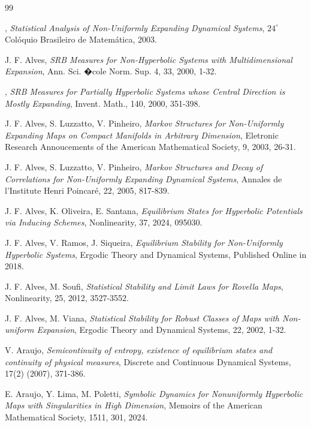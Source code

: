 \documentclass[12pt,a4paper]{amsart}
\theoremstyle{plain}
\begin{document}
 
\begin{thebibliography}{99}
	
	, {\it Statistical Analysis of Non-Uniformly Expanding Dynamical Systems}, $24^{\circ}$ Col\' oquio Brasileiro de Matem\' atica, 2003.
	
	 {\sc J. F. Alves}, {\it SRB Measures for Non-Hyperbolic Systems with Multidimensional Expansion}, Ann. Sci. �cole Norm. Sup. 4, 33, 2000, 1-32.
	
	, {\it SRB Measures for Partially Hyperbolic Systems whose Central Direction is Mostly Expanding}, Invent. Math., 140, 2000, 351-398.
	
	 {\sc J. F. Alves, S. Luzzatto, V. Pinheiro}, {\it Markov Structures for Non-Uniformly Expanding Maps on Compact Manifolds in Arbitrary Dimension}, Eletronic Research Annoucements of the American Mathematical Society, 9, 2003, 26-31. 
	
	 {\sc J. F. Alves, S. Luzzatto, V. Pinheiro}, {\it Markov Structures and Decay of Correlations for Non-Uniformly Expanding Dynamical Systems},  Annales de l'Institute Henri Poincar\' e, 22, 2005, 817-839. 
	
	 {\sc J. F. Alves, K. Oliveira, E. Santana}, {\it Equilibrium States for Hyperbolic Potentials via Inducing Schemes}, Nonlinearity, 37, 2024, 095030.  
	
	 {\sc J. F. Alves, V. Ramos, J. Siqueira}, {\it Equilibrium Stability for Non-Uniformly Hyperbolic Systems},  Ergodic Theory and Dynamical Systems, Published Online in 2018.
	
	 {\sc J. F. Alves, M. Soufi}, {\it Statistical Stability and Limit Laws for Rovella Maps}, Nonlinearity, 25, 2012, 3527-3552.
	
	 {\sc J. F. Alves, M. Viana}, {\it Statistical Stability for Robust Classes of Maps with Non-uniform Expansion}, Ergodic Theory and Dynamical Systems, 22, 2002, 1-32. 
	
	 {\sc V. Araujo}, {\it Semicontinuity of entropy, existence of equilibrium states and continuity of physical measures}, Discrete and Continuous Dynamical Systems,  17(2) (2007), 371-386.
	
	 {\sc E. Araujo, Y. Lima, M. Poletti}, {\it Symbolic Dynamics for Nonuniformly Hyperbolic
		Maps with Singularities in High Dimension}, Memoirs of the American Mathematical Society, 1511, 301, 2024. 
	

\end{thebibliography}
\end{document}
